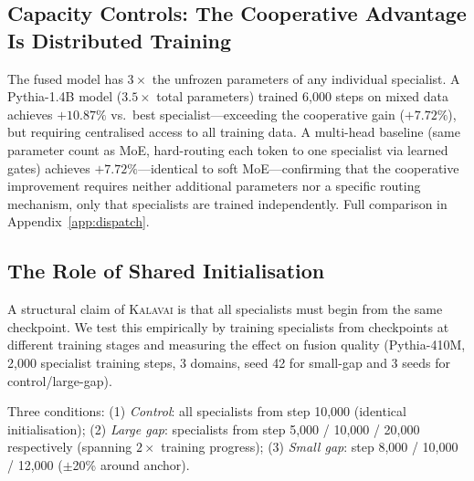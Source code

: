 \documentclass{article}
\newcommand{\kalavai}{\textsc{Kalavai}\xspace}
\begin{document}
\subsection{Capacity Controls: The Cooperative Advantage Is Distributed Training}
\label{sec:capacity}

The fused model has $3\times$ the unfrozen parameters of any individual specialist. A Pythia-1.4B model ($3.5\times$ total parameters) trained 6,000 steps on mixed data achieves $+10.87\%$ vs.\ best specialist---exceeding the cooperative gain ($+7.72\%$), but requiring centralised access to all training data. A multi-head baseline (same parameter count as MoE, hard-routing each token to one specialist via learned gates) achieves $+7.72\%$---identical to soft MoE---confirming that the cooperative improvement requires neither additional parameters nor a specific routing mechanism, only that specialists are trained independently. Full comparison in Appendix~\ref{app:dispatch}.

\subsection{The Role of Shared Initialisation}
\label{sec:sharedinit}

A structural claim of \kalavai is that all specialists must begin from the same checkpoint. We test this empirically by training specialists from checkpoints at different training stages and measuring the effect on fusion quality (Pythia-410M, 2,000 specialist training steps, 3 domains, seed 42 for small-gap and 3 seeds for control/large-gap).

Three conditions: (1) \emph{Control}: all specialists from step 10,000 (identical initialisation); (2) \emph{Large gap}: specialists from step 5,000 / 10,000 / 20,000 respectively (spanning $2\times$ training progress); (3) \emph{Small gap}: step 8,000 / 10,000 / 12,000 ($\pm$20\% around anchor).
\end{document}
